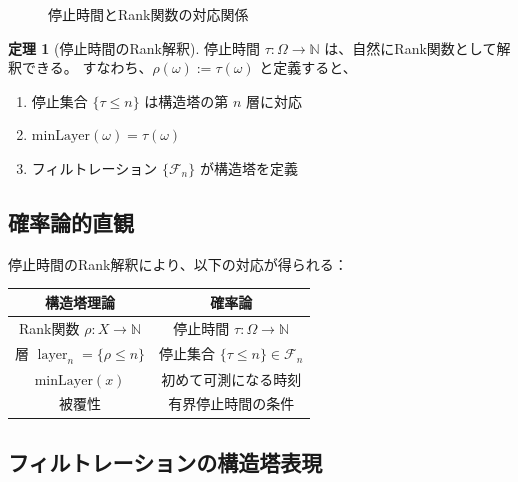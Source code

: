 \documentclass[a4paper,12pt]{ltjsarticle}
\theoremstyle{definition}
\newtheorem{theorem}[definition]{定理}
\newcommand{\N}{\mathbb{N}}
\newcommand{\F}{\mathcal{F}}
\newcommand{\minLayer}{\mathrm{minLayer}}
\DeclareMathOperator{\layer}{layer}
\begin{document}
\begin{figure}[h]
\centering
{}
\caption{停止時間とRank関数の対応関係}
\label{fig:stopping-rank-correspondence}
\end{figure}

\begin{theorem}[停止時間のRank解釈]
\label{thm:stopping-as-rank}
停止時間 $\tau : \Omega \to \N$ は、自然にRank関数として解釈できる。
すなわち、$\rho(\omega) := \tau(\omega)$ と定義すると、
\begin{enumerate}
  \item 停止集合 $\{\tau \leq n\}$ は構造塔の第 $n$ 層に対応
  \item $\minLayer(\omega) = \tau(\omega)$
  \item フィルトレーション $\{\F_n\}$ が構造塔を定義
\end{enumerate}
\end{theorem}

\subsection{確率論的直観}

停止時間のRank解釈により、以下の対応が得られる：

\begin{center}
\begin{tabular}{c|c}
\hline
構造塔理論 & 確率論 \\
\hline
Rank関数 $\rho : X \to \N$ & 停止時間 $\tau : \Omega \to \N$ \\
層 $\layer_n = \{\rho \leq n\}$ & 停止集合 $\{\tau \leq n\} \in \F_n$ \\
$\minLayer(x)$ & 初めて可測になる時刻 \\
被覆性 & 有界停止時間の条件 \\
\hline
\end{tabular}
\end{center}

\subsection{フィルトレーションの構造塔表現}
\end{document}
